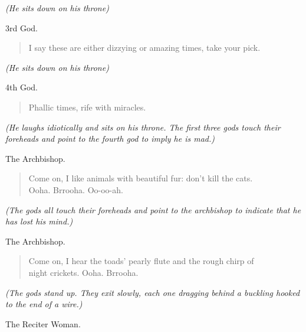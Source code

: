 \documentclass[letterpaper,article,12pt,oneside,notitlepage]{memoir}
\begin{document}
\textit{(He sits down on his throne)}

\begin{center}3rd God.\end{center}

\begin{verse}
I say these are either dizzying or amazing times, take your pick. \\
\end{verse}

\textit{(He sits down on his throne)}

\begin{center}4th God.\end{center}

\begin{verse}
Phallic times, rife with miracles. \\
\end{verse}

\textit{(He laughs idiotically and sits on his throne. The first three gods touch their foreheads and point to the fourth god to imply he is mad.)}

\clearpage

\begin{center}The Archbishop.\end{center}

\begin{verse}
Come on, I like animals with beautiful fur: don't kill the cats. \\
Ooha. Brrooha. Oo-oo-ah. \\
\end{verse}

\textit{(The gods all touch their foreheads and point to the archbishop to indicate that he has lost his mind.)}

\begin{center}The Archbishop.\end{center}

\begin{verse}
Come on, I hear the toads' pearly flute and the rough chirp of \\
night crickets. Ooha. Brrooha. \\
\end{verse}

\textit{(The gods stand up. They exit slowly, each one dragging behind a buckling hooked to the end of a wire.)}

\begin{center}The Reciter Woman.\end{center}
\end{document}
